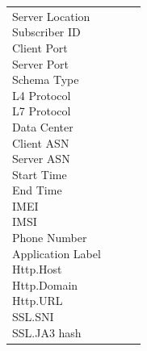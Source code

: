 \begin{description}
\begin{longtable}{p{}|p{}|p{}|p{}}
{                                                                        Server Location\\
                                                                        Subscriber ID\\
                                                                        Client Port\\
                                                                        Server Port\\
                                                                        Schema Type\\
                                                                        L4 Protocol\\
                                                                        L7 Protocol\\
                                                                        Data Center\\
                                                                        Client ASN\\
                                                                        Server ASN\\
                                                                        Start Time\\
                                                                        End Time\\
                                                                        IMEI\\
                                                                        IMSI\\
                                                                        Phone Number\\
                                                                        Application Label\\
                                                                        Http.Host\\
                                                                        Http.Domain\\
                                                                        Http.URL\\
                                                                        SSL.SNI\\
                                                                        SSL.JA3 hash\\
}
\end{longtable}
\end{description}
